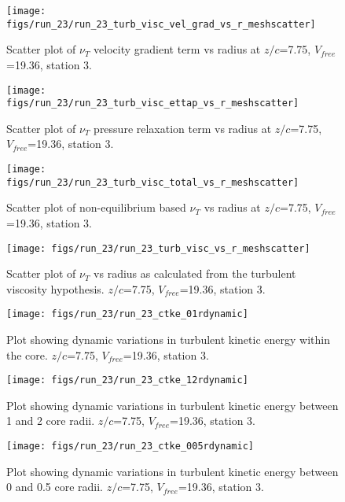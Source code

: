 \begin{figure}[H]
\centering
\texttt{[image: figs/run\_23/run\_23\_turb\_visc\_vel\_grad\_vs\_r\_meshscatter]}
\caption{Scatter plot of $\nu_T$ velocity gradient term vs radius at $z/c$=7.75, $V_{free}$=19.36, station 3.}
\end{figure}


\begin{figure}[H]
\centering
\texttt{[image: figs/run\_23/run\_23\_turb\_visc\_ettap\_vs\_r\_meshscatter]}
\caption{Scatter plot of $\nu_T$ pressure relaxation term vs radius at $z/c$=7.75, $V_{free}$=19.36, station 3.}
\end{figure}


\begin{figure}[H]
\centering
\texttt{[image: figs/run\_23/run\_23\_turb\_visc\_total\_vs\_r\_meshscatter]}
\caption{Scatter plot of non-equilibrium based $\nu_T$ vs radius at $z/c$=7.75, $V_{free}$=19.36, station 3.}
\end{figure}


\begin{figure}[H]
\centering
\texttt{[image: figs/run\_23/run\_23\_turb\_visc\_vs\_r\_meshscatter]}
\caption{Scatter plot of $\nu_T$ vs radius as calculated from the turbulent viscosity hypothesis. $z/c$=7.75, $V_{free}$=19.36, station 3.}
\end{figure}


\begin{figure}[H]
\centering
\texttt{[image: figs/run\_23/run\_23\_ctke\_01rdynamic]}
\caption{Plot showing dynamic variations in turbulent kinetic energy within the core. $z/c$=7.75, $V_{free}$=19.36, station 3.}
\end{figure}


\begin{figure}[H]
\centering
\texttt{[image: figs/run\_23/run\_23\_ctke\_12rdynamic]}
\caption{Plot showing dynamic variations in turbulent kinetic energy between 1 and 2 core radii. $z/c$=7.75, $V_{free}$=19.36, station 3.}
\end{figure}


\begin{figure}[H]
\centering
\texttt{[image: figs/run\_23/run\_23\_ctke\_005rdynamic]}
\caption{Plot showing dynamic variations in turbulent kinetic energy between 0 and 0.5 core radii. $z/c$=7.75, $V_{free}$=19.36, station 3.}
\end{figure}


